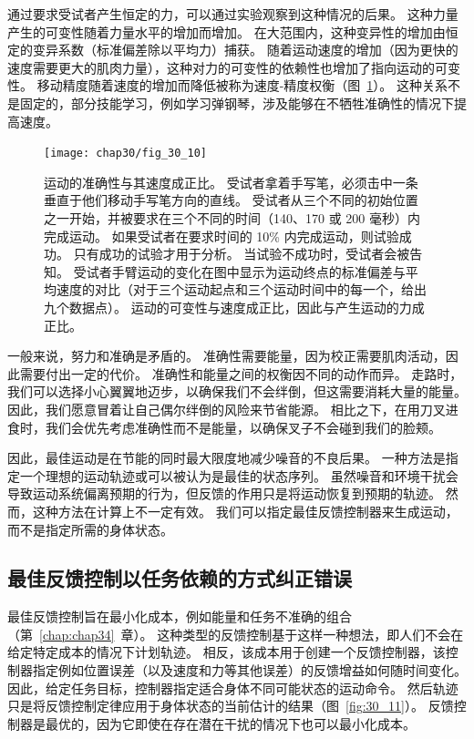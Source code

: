 通过要求受试者产生恒定的力，可以通过实验观察到这种情况的后果。
这种力量产生的可变性随着力量水平的增加而增加。
在大范围内，这种变异性的增加由恒定的变异系数（标准偏差除以平均力）捕获。
随着运动速度的增加（因为更快的速度需要更大的肌肉力量），这种对力的可变性的依赖性也增加了指向运动的可变性。
移动精度随着速度的增加而降低被称为速度-精度权衡（图~\ref{fig:30_10}）。
这种关系不是固定的，部分技能学习，例如学习弹钢琴，涉及能够在不牺牲准确性的情况下提高速度。


\begin{figure}[htbp]
	\centering
	\texttt{[image: chap30/fig\_30\_10]}
	\caption{运动的准确性与其速度成正比。
		受试者拿着手写笔，必须击中一条垂直于他们移动手写笔方向的直线。
		受试者从三个不同的初始位置之一开始，并被要求在三个不同的时间（140、170 或 200 毫秒）内完成运动。
		如果受试者在要求时间的 10\% 内完成运动，则试验成功。
		只有成功的试验才用于分析。
		当试验不成功时，受试者会被告知。
		受试者手臂运动的变化在图中显示为运动终点的标准偏差与平均速度的对比（对于三个运动起点和三个运动时间中的每一个，给出九个数据点）。
		运动的可变性与速度成正比，因此与产生运动的力成正比\cite{schmidt1979motor}。}
	\label{fig:30_10}
\end{figure}


一般来说，努力和准确是矛盾的。
准确性需要能量，因为校正需要肌肉活动，因此需要付出一定的代价。
准确性和能量之间的权衡因不同的动作而异。
走路时，我们可以选择小心翼翼地迈步，以确保我们不会绊倒，但这需要消耗大量的能量。
因此，我们愿意冒着让自己偶尔绊倒的风险来节省能源。
相比之下，在用刀叉进食时，我们会优先考虑准确性而不是能量，以确保叉子不会碰到我们的脸颊。


因此，最佳运动是在节能的同时最大限度地减少噪音的不良后果。
一种方法是指定一个理想的运动轨迹或可以被认为是最佳的状态序列。
虽然噪音和环境干扰会导致运动系统偏离预期的行为，但反馈的作用只是将运动恢复到预期的轨迹。
然而，这种方法在计算上不一定有效。
我们可以指定最佳反馈控制器来生成运动，而不是指定所需的身体状态。



\subsection{最佳反馈控制以任务依赖的方式纠正错误}

最佳反馈控制旨在最小化成本，例如能量和任务不准确的组合（第~\ref{chap:chap34}~章）。
这种类型的反馈控制基于这样一种想法，即人们不会在给定特定成本的情况下计划轨迹。
相反，该成本用于创建一个反馈控制器，该控制器指定例如位置误差（以及速度和力等其他误差）的反馈增益如何随时间变化。
因此，给定任务目标，控制器指定适合身体不同可能状态的运动命令。
然后轨迹只是将反馈控制定律应用于身体状态的当前估计的结果（图~\ref{fig:30_11}）。
反馈控制器是最优的，因为它即使在存在潜在干扰的情况下也可以最小化成本。



